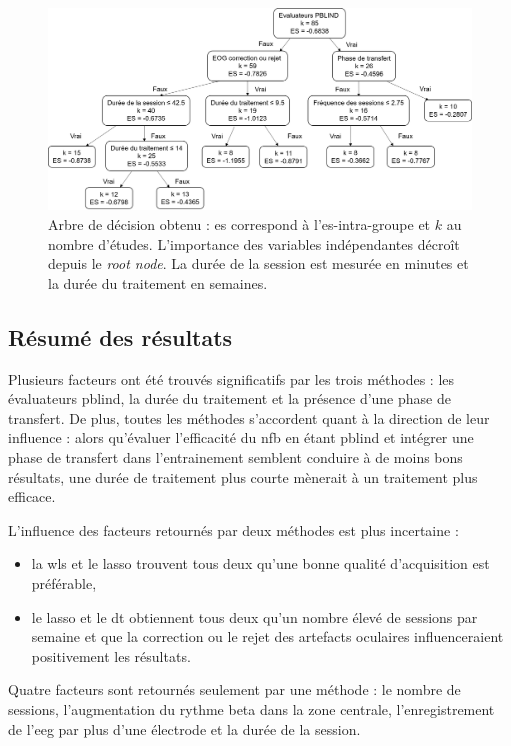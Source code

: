 \begin{figure}[h!]
  \centering
	\includegraphics[width=1\linewidth]{figures/chapter-3/factors-decision-tree} 
  \caption{Arbre de décision obtenu : \gls{es} correspond à l'\gls{es}-intra-groupe et $k$ au nombre d'études. L'importance des variables indépendantes
	décroît depuis le \textit{root node}. La durée de la session est mesurée en minutes et la durée du traitement en semaines.}
  \label{Figure:factors_decision_tree}
\end{figure}

\subsection{Résumé des résultats}

Plusieurs facteurs ont été trouvés significatifs par les trois méthodes : les évaluateurs \gls{pblind}, la durée du traitement et la présence d'une phase de transfert. 
De plus, toutes les méthodes s'accordent quant à la direction de leur influence : alors qu'évaluer l'efficacité du \gls{nfb} en étant \gls{pblind}
et intégrer une phase de transfert dans l'entrainement semblent conduire à de moins bons résultats, une durée de traitement plus courte mènerait à un traitement plus efficace. 

L'influence des facteurs retournés par deux méthodes est plus incertaine :
\begin{itemize}
	\item la \gls{wls} et le \gls{lasso} trouvent tous deux qu'une bonne qualité d'acquisition est préférable,
  \item le \gls{lasso} et le \gls{dt} obtiennent tous deux qu'un nombre élevé de sessions par semaine et que la correction ou le rejet des artefacts oculaires
	influenceraient positivement les résultats. 
\end{itemize}

Quatre facteurs sont retournés seulement par une méthode : le nombre de sessions, l'augmentation du rythme beta dans la zone centrale, l'enregistrement
de l'\gls{eeg} par plus d'une électrode et la durée de la session. 


